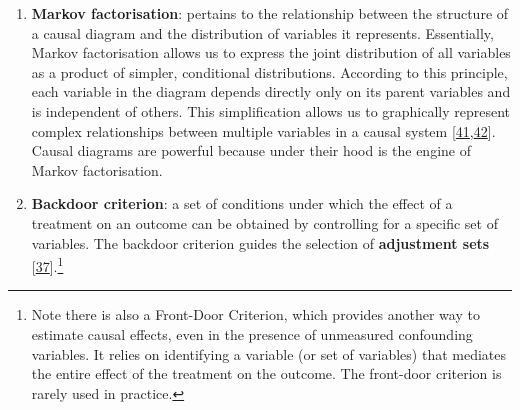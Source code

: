 \documentclass[
  singlecolumn]{article}
\begin{document}
\begin{enumerate}
\def\labelenumi{\arabic{enumi}.}
\setcounter{enumi}{9}
\item
  \textbf{Markov factorisation}: pertains to the relationship between
  the structure of a causal diagram and the distribution of variables it
  represents. Essentially, Markov factorisation allows us to express the
  joint distribution of all variables as a product of simpler,
  conditional distributions. According to this principle, each variable
  in the diagram depends directly only on its parent variables and is
  independent of others. This simplification allows us to graphically
  represent complex relationships between multiple variables in a causal
  system
  {[}\protect\hyperlink{ref-lauritzen1990}{41},\protect\hyperlink{ref-pearl1988}{42}{]}.
  Causal diagrams are powerful because under their hood is the engine of
  Markov factorisation.
\item
  \textbf{Backdoor criterion}: a set of conditions under which the
  effect of a treatment on an outcome can be obtained by controlling for
  a specific set of variables. The backdoor criterion guides the
  selection of \textbf{adjustment sets}
  {[}\protect\hyperlink{ref-pearl1995}{37}{]}.\footnote{Note there is
    also a Front-Door Criterion, which provides another way to estimate
    causal effects, even in the presence of unmeasured confounding
    variables. It relies on identifying a variable (or set of variables)
    that mediates the entire effect of the treatment on the outcome. The
    front-door criterion is rarely used in practice.}
\end{enumerate}
\end{document}
